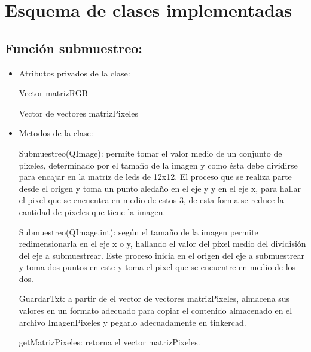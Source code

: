 \documentclass{article}
\begin{document}
\section{Esquema de clases implementadas}
\subsection{Función submuestreo: }

\begin{itemize}
\item Atributos privados de la clase:

\hspace{0.5cm}Vector matrizRGB

\hspace{0.5cm}Vector de vectores matrizPixeles

\item Metodos de la clase:

\hspace{0.5cm}Submuestreo(QImage): permite tomar el valor medio de un conjunto de pixeles, determinado por el tamaño de la imagen y como ésta debe dividirse para encajar en la matriz de leds de 12x12. El proceso que se realiza parte desde el origen y toma un punto aledaño en el eje y y en el eje x, para hallar el pixel que se encuentra en medio de estos 3, de esta forma se reduce la cantidad de pixeles que tiene la imagen. 

\hspace{0.5cm}Submuestreo(QImage,int): según el tamaño de la imagen permite redimensionarla en el eje x o y, hallando el valor del pixel medio del dividisión del eje a submuestrear. Este proceso inicia en el origen del eje a submuestrear y toma dos puntos en este y toma el pixel que se encuentre en medio de los dos.

\hspace{0.5cm}GuardarTxt: a partir de el vector de vectores matrizPixeles, almacena sus valores en un formato adecuado para copiar el contenido almacenado en el archivo ImagenPixeles y pegarlo adecuadamente en tinkercad.

\hspace{0.5cm}getMatrizPixeles: retorna el vector matrizPixeles.


\end{itemize}
\end{document}
